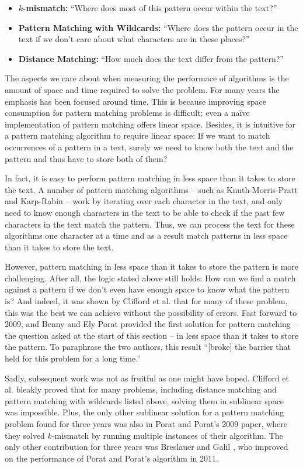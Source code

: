 \documentclass[ %
                    author={Dominic Joseph Moylett},
                    degree={MEng},
                     title={Dictionary Matching with Fingerprints},
                  subtitle={An Empirical Analysis},
                      type={research},
                      year={2015} ]{dissertation}
\begin{document}
\begin{itemize}
  \item \textbf{$k$-mismatch:} ``Where does most of this pattern occur within the text?''
  \item \textbf{Pattern Matching with Wildcards:} ``Where does the pattern occur in the text if we don't care about what characters are in these places?''
  \item \textbf{Distance Matching:} ``How much does the text differ from the pattern?''
\end{itemize}

The aspects we care about when measuring the performace of algorithms is the amount of space and time required to solve the problem. For many years the emphasis has been focused around time. This is because improving space consumption for pattern matching problems is difficult; even a na\"{i}ve implementation of pattern matching offers linear space. Besides, it is intuitive for a pattern matching algorithm to require linear space: If we want to match occurrences of a pattern in a text, surely we need to know both the text and the pattern and thus have to store both of them?

In fact, it is easy to perform pattern matching in less space than it takes to store the text. A number of pattern matching algorithms -- such as Knuth-Morris-Pratt \cite{kmp} and Karp-Rabin \cite{5390135} -- work by iterating over each character in the text, and only need to know enough characters in the text to be able to check if the past few characters in the text match the pattern. Thus, we can process the text for these algorithms one character at a time and as a result match patterns in less space than it takes to store the text.

However, pattern matching in less space than it takes to store the pattern is more challenging. After all, the logic stated above still holds: How can we find a match against a pattern if we don't even have enough space to know what the pattern is? And indeed, it was shown by Clifford et al. \cite{clifford:black-box} that for many of these problem, this was the best we can achieve without the possibility of errors. Fast forward to 2009, and Benny and Ely Porat \cite{5438620} provided the first solution for pattern matching -- the question asked at the start of this section -- in less space than it takes to store the pattern. To paraphrase the two authors, this result ``[broke] the barrier that held for this problem for a long time.''

Sadly, subsequent work was not as fruitful as one might have hoped. Clifford et al. \cite{DBLP:journals/corr/abs-1106-4412} bleakly proved that for many problems, including distance matching and pattern matching with wildcards listed above, solving them in sublinear space was impossible. Plus, the only other sublinear solution for a pattern matching problem found for three years was also in Porat and Porat's 2009 paper, where they solved $k$-mismatch by running multiple instances of their algorithm. The only other contribution for three years was Breslauer and Galil \cite{Breslauer:2014:RSS:2660854.2635814}, who improved on the performance of Porat and Porat's algorithm in 2011.
\end{document}
